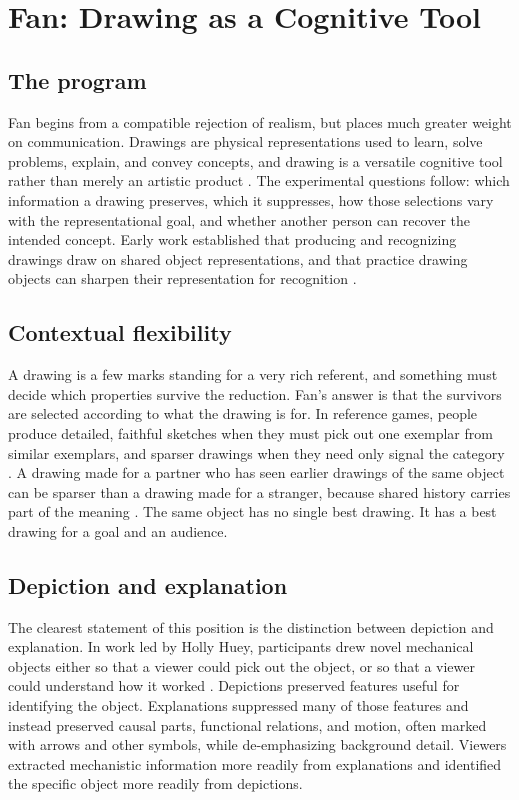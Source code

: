 \documentclass[11pt]{article}
\theoremstyle{remark}
\begin{document}
\section{Fan: Drawing as a Cognitive Tool}
\label{sec:fan}

\subsection{The program}

Fan begins from a compatible rejection of realism, but places much greater weight on communication. Drawings are physical representations used to learn, solve problems, explain, and convey concepts, and drawing is a versatile cognitive tool rather than merely an artistic product \cite{fan2023versatile}. The experimental questions follow: which information a drawing preserves, which it suppresses, how those selections vary with the representational goal, and whether another person can recover the intended concept. Early work established that producing and recognizing drawings draw on shared object representations, and that practice drawing objects can sharpen their representation for recognition \cite{fan2018common}.

\subsection{Contextual flexibility}

A drawing is a few marks standing for a very rich referent, and something must decide which properties survive the reduction. Fan's answer is that the survivors are selected according to what the drawing is for. In reference games, people produce detailed, faithful sketches when they must pick out one exemplar from similar exemplars, and sparser drawings when they need only signal the category \cite{fan2020pragmatic}. A drawing made for a partner who has seen earlier drawings of the same object can be sparser than a drawing made for a stranger, because shared history carries part of the meaning \cite{hawkins2023resemblance}. The same object has no single best drawing. It has a best drawing for a goal and an audience.

\subsection{Depiction and explanation}

The clearest statement of this position is the distinction between depiction and explanation. In work led by Holly Huey, participants drew novel mechanical objects either so that a viewer could pick out the object, or so that a viewer could understand how it worked \cite{huey2023explanations}. Depictions preserved features useful for identifying the object. Explanations suppressed many of those features and instead preserved causal parts, functional relations, and motion, often marked with arrows and other symbols, while de-emphasizing background detail. Viewers extracted mechanistic information more readily from explanations and identified the specific object more readily from depictions.
\end{document}
